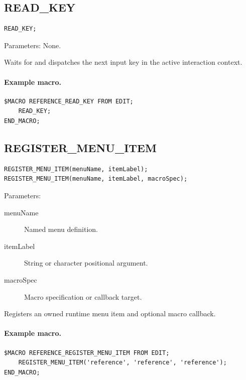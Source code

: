 \documentclass[a4paper,10pt,twoside,openany]{book}
\newenvironment{mrmacextension}{\begin{changebar}}{\end{changebar}}
\begin{document}
\label{prim:procedure-read-key}
\subsection*{READ\_KEY}
\begin{verbatim}
READ_KEY;
\end{verbatim}
Parameters: None.

Waits for and dispatches the next input key in the active interaction context.

\paragraph{Example macro.}
\begin{verbatim}
$MACRO REFERENCE_READ_KEY FROM EDIT;
    READ_KEY;
END_MACRO;
\end{verbatim}

\begin{mrmacextension}
\label{prim:procedure-register-menu-item}
\subsection*{REGISTER\_MENU\_ITEM}
\begin{verbatim}
REGISTER_MENU_ITEM(menuName, itemLabel);
REGISTER_MENU_ITEM(menuName, itemLabel, macroSpec);
\end{verbatim}
Parameters:
\begin{description}
\item[menuName] Named menu definition.
\item[itemLabel] String or character positional argument.
\item[macroSpec] Macro specification or callback target.
\end{description}

Registers an owned runtime menu item and optional macro callback.

\paragraph{Example macro.}
\begin{verbatim}
$MACRO REFERENCE_REGISTER_MENU_ITEM FROM EDIT;
    REGISTER_MENU_ITEM('reference', 'reference', 'reference');
END_MACRO;
\end{verbatim}
\end{mrmacextension}
\end{document}
